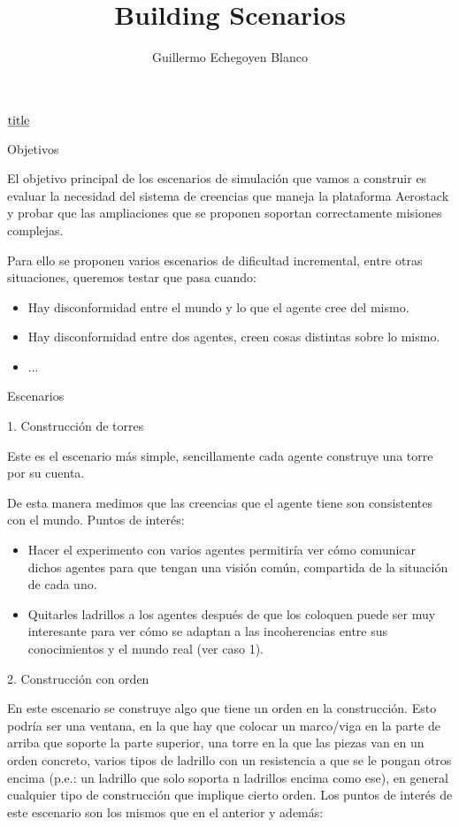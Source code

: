 \documentclass[12pt]{report}
\title{\textbf{Building Scenarios}}
\author{Guillermo Echegoyen Blanco}
\makeatletter
\newcommand{\textunderline}[1]{$\underline{\mbox{#1}}$} %
\newcommand{\mktitle}[1]{{\Large {\color{NavyBlue} #1}}}
\newcommand{\mksection}[1]{{\large {\color{NavyBlue} #1}}}
\let\thetitle\@title
\let\theauthor\@author
\let\thedate\@date
\newcommand{\insertheader}{
  {
    \centering
    \mktitle{
      \textunderline{\thetitle} \par
      \theauthor \par
      \thedate
    }
    \par
  }
}
\makeatother
\begin{document}
\insertheader

\mksection{Objetivos}

  El objetivo principal de los escenarios de simulaci\'on que vamos a construir es evaluar la necesidad del sistema de creencias que maneja la plataforma Aerostack y probar que las ampliaciones que se proponen soportan correctamente misiones complejas.

  Para ello se proponen varios escenarios de dificultad incremental, entre otras situaciones, queremos testar que pasa cuando:
  \begin{itemize}
    \item Hay disconformidad entre el mundo y lo que el agente cree del mismo.
    \item Hay disconformidad entre dos agentes, creen cosas distintas sobre lo mismo.
    \item ...
  \end{itemize}

\mksection{Escenarios}

\mksection{\normalsize{1. Construcci\'on de torres}}

  Este es el escenario m\'as simple, sencillamente cada agente construye una torre por su cuenta.

  De esta manera medimos que las creencias que el agente tiene son consistentes con el mundo. Puntos de inter\'es:

  \begin{itemize}
    \item Hacer el experimento con varios agentes permitir\'ia ver c\'omo comunicar dichos agentes para que tengan una visi\'on com\'un, compartida de la situaci\'on de cada uno.
    \item Quitarles ladrillos a los agentes despu\'es de que los coloquen puede ser muy interesante para ver c\'omo se adaptan a las incoherencias entre sus conocimientos y el mundo real (ver caso 1).
  \end{itemize}

\clearpage
\mksection{\normalsize{2. Construcci\'on con orden}}

  En este escenario se construye algo que tiene un orden en la construcci\'on. Esto podr\'ia ser una ventana, en la que hay que colocar un marco/viga en la parte de arriba que soporte la parte superior, una torre en la que las piezas van en un orden concreto, varios tipos de ladrillo con un resistencia a que se le pongan otros encima (p.e.: un ladrillo que solo soporta n ladrillos encima como ese), en general cualquier tipo de construcci\'on que implique cierto orden. Los puntos de inter\'es de este escenario son los mismos que en el anterior y adem\'as:
\end{document}
